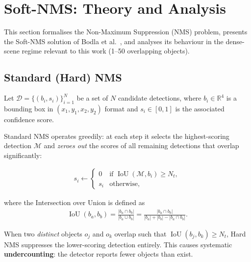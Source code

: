 
\section{Soft-NMS: Theory and Analysis}
\label{sec:soft_nms_theory}

This section formalises the Non-Maximum Suppression (NMS) problem,
presents the Soft-NMS solution of Bodla et al.~\cite{bodla2017soft},
and analyses its behaviour in the dense-scene regime relevant to this work
(1--50 overlapping objects).

\subsection{Standard (Hard) NMS}
\label{ssec:hard_nms}

Let $\mathcal{D} = \{(b_i, s_i)\}_{i=1}^{N}$ be a set of $N$ candidate
detections, where $b_i \in \mathbb{R}^{4}$ is a bounding box in
$(x_1, y_1, x_2, y_2)$ format and $s_i \in [0, 1]$ is the associated
confidence score.

Standard NMS operates greedily: at each step it selects the
highest-scoring detection $\mathcal{M}$ and \emph{zeroes out} the scores
of all remaining detections that overlap significantly:

\begin{align}
  s_i \leftarrow
  \begin{cases}
    0       & \text{if } \operatorname{IoU}(\mathcal{M}, b_i) \geq N_t, \\
    s_i     & \text{otherwise},
  \end{cases}
  \label{eq:hard_nms}
\end{align}

\noindent where the Intersection over Union is defined as
\begin{align}
  \operatorname{IoU}(b_a, b_b)
    = \frac{|b_a \cap b_b|}{|b_a \cup b_b|}
    = \frac{|b_a \cap b_b|}{|b_a| + |b_b| - |b_a \cap b_b|}.
  \label{eq:iou}
\end{align}

\begin{proposition}
\label{prop:hard_nms_failure}
When two \emph{distinct} objects $o_j$ and $o_k$ overlap such that
$\operatorname{IoU}(b_j, b_k) \geq N_t$, Hard NMS suppresses the
lower-scoring detection entirely.  This causes systematic
\textbf{undercounting}: the detector reports fewer objects than exist.
\end{proposition}


